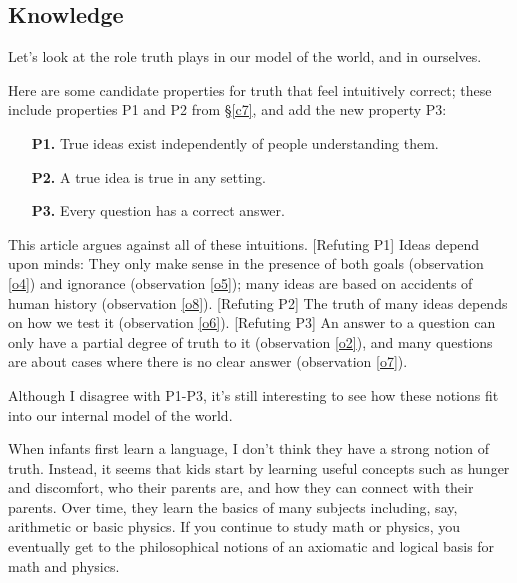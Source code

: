 \documentclass[11pt, oneside]{article}
\theoremstyle{argtstyle}
\begin{document}
\subsection{Knowledge}


Let's look at the role truth plays in our model of the world, and in
ourselves.

Here are some candidate properties for truth that feel intuitively correct;
these include properties P1 and P2 from \S\ref{c7}, and
add the new property P3:
\begin{itemize}
    \item[{\bf P1.}] True ideas exist independently of people understanding
        them.
    \item[{\bf P2.}] A true idea is true in any setting.
    \item[{\bf P3.}] Every question has a correct answer.
\end{itemize}
This article argues against all of these intuitions.
[Refuting P1] Ideas depend upon minds: They only make sense in the presence of
both goals (observation \ref{o4}) and ignorance (observation \ref{o5}); many
ideas are based on accidents of human history (observation \ref{o8}).
[Refuting P2] The
truth of many ideas depends on how we test it (observation \ref{o6}).
[Refuting P3] An answer to a question can only have a partial degree of truth to
it
(observation \ref{o2}), and many questions are about cases where
there is no clear answer (observation \ref{o7}).

Although I disagree with P1-P3, it's still interesting to see how these notions
fit into our internal model of the world.

When infants first learn a language,
I don't think they have a strong
notion of truth.
Instead, it seems that kids start by learning
useful concepts such as
hunger and discomfort, who their parents are, and how they can connect with
their parents.
Over time, they learn the basics of many subjects including, say,
arithmetic or basic physics.
If you continue to study math or physics, you eventually get to the
philosophical notions of an axiomatic and logical basis for math and physics.
\end{document}
